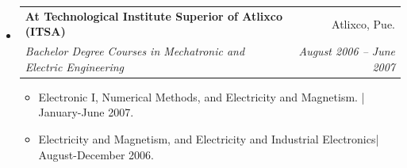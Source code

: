 \documentclass[10pt]{article}
\makeatletter
\newcommand{\resitem}[1]{\item #1 \vspace{-2pt}}
\newcommand{\ressubheading}[4]{
\begin{tabular*}{6.5in}{l@{\extracolsep{\fill}}r}
		\textbf{#1} & #2 \\
		\textit{#3} & \textit{#4} \\
\end{tabular*}\vspace{-6pt}}
\makeatother
\begin{document}
\begin{itemize}
		\item 
		      \ressubheading{At Technological Institute Superior of Atlixco (ITSA)}{Atlixco, Pue.}{Bachelor Degree Courses in Mechatronic and Electric Engineering}{August 2006 -- June 2007}
				{ \footnotesize
				\begin{itemize}
					\resitem{Electronic I, Numerical Methods, and Electricity and Magnetism.  | January-June 2007.}	    
					\resitem{Electricity and Magnetism, and Electricity and Industrial Electronics| August-December 2006.}
				\end{itemize}
				}

\end{itemize}  %



% 
 \newpage
\end{document}
